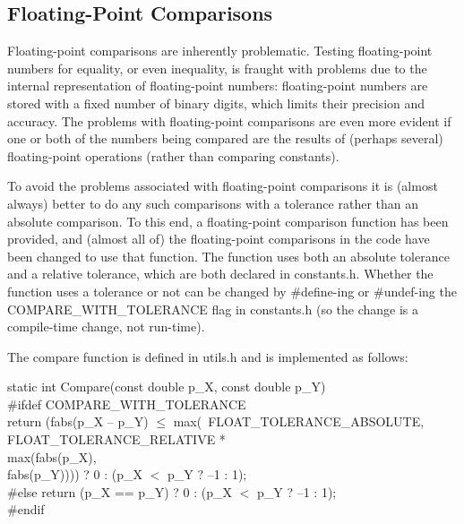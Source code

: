 \subsection{Floating-Point Comparisons}\label{sec:Floating-PointComparisons}

Floating-point comparisons are inherently problematic. Testing floating-point numbers for equality, or even inequality, is fraught with problems due to the internal representation of floating-point numbers: floating-point numbers are stored with a fixed number of binary digits, which limits their precision and accuracy. The problems with floating-point comparisons are even more evident if one or both of the numbers being compared are the results of (perhaps several) floating-point operations (rather than comparing constants).

To avoid the problems associated with floating-point comparisons it is (almost always) better to do any such comparisons with a tolerance rather than an absolute comparison. To this end, a floating-point comparison function has been provided, and (almost all of) the floating-point comparisons in the code have been changed to use that function. The function uses both an absolute tolerance and a relative tolerance, which are both declared in constants.h. Whether the function uses a tolerance or not can be changed by \#define-ing or \#undef-ing the COMPARE\_WITH\_TOLERANCE flag in constants.h (so the change is a compile-time change, not run-time).

The compare function is defined in utils.h and is implemented as follows:

\medskip

\hfill
\begin{minipage}{\dimexpr\textwidth-2em}
static int Compare(const double p\_X, const double p\_Y)\ \lcb \\
\#ifdef COMPARE\_WITH\_TOLERANCE \\
\tabto{2em}return (fabs(p\_X -- p\_Y) $\leq$ max(\ \tabto{15em}FLOAT\_TOLERANCE\_ABSOLUTE, \\
\tabto{15em}FLOAT\_TOLERANCE\_RELATIVE * \\
\tabto{15em}max(\tabto{17.25em}fabs(p\_X), \\
\tabto{17.25em}fabs(p\_Y)))) ? 0 : (p\_X $\mathrm{<}$ p\_Y ? --1 : 1); \\
\#else
\tabto{2em}return (p\_X == p\_Y) ? 0 : (p\_X $\mathrm{<}$ p\_Y ? --1 : 1); \\
\#endif
\end{minipage}

